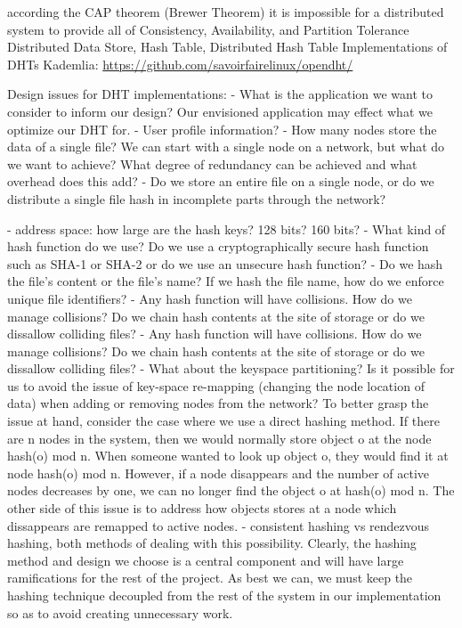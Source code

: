 \documentclass[12pt]{article}
\begin{document}
    according the CAP theorem (Brewer Theorem) it is impossible for a distributed
    system to provide all of Consistency, Availability, and Partition Tolerance
    Distributed Data Store, Hash Table, Distributed Hash Table
    Implementations of DHTs
        Kademlia:
        \url{https://github.com/savoirfairelinux/opendht/}
    
    Design issues for DHT implementations:
    - What is the application we want to consider to inform our design?  Our
      envisioned application may effect what we optimize our DHT for.
      - User profile information?
    - How many nodes store the data of a single file?  We can start with a
      single node on a network, but what do we want to achieve?  What degree of
      redundancy can be achieved and what overhead does this add?
    - Do we store an entire file on a single node, or do we distribute a single
      file hash in incomplete parts through the network?

    - address space: how large are the hash keys?  128 bits?  160 bits?
    - What kind of hash function do we use?  Do we use a cryptographically
      secure hash function such as SHA-1 or SHA-2 or do we use an unsecure hash
      function?
    - Do we hash the file's content or the file's name?  If we hash the file
      name, how do we enforce unique file identifiers?
    - Any hash function will have collisions.  How do we manage collisions?
      Do we chain hash contents at the site of storage or do we dissallow
      colliding files?
    - Any hash function will have collisions.  How do we manage collisions?
      Do we chain hash contents at the site of storage or do we dissallow
      colliding files?
    - What about the keyspace partitioning?  Is it possible for us to avoid the
      issue of key-space re-mapping (changing the node location of data) when
      adding or removing nodes from the network?
      To better grasp the issue at hand, consider the case where we use a direct
      hashing method.  If there are n nodes in the system, then we would
      normally store object o at the node hash(o) mod n.  When someone wanted to
      look up object o, they would find it at node hash(o) mod n.  However, if a
      node disappears and the number of active nodes decreases by one, we can no
      longer find the object o at hash(o) mod n.  The other side of this issue
      is to address how objects stores at a node which dissappears are remapped
      to active nodes.
      - consistent hashing vs rendezvous hashing, both methods of dealing with
        this possibility.
    Clearly, the hashing method and design we choose is a central component and
    will have large ramifications for the rest of the project.  As best we can,
    we must keep the hashing technique decoupled from the rest of the system in
    our implementation so as to avoid creating unnecessary work.
\end{document}

